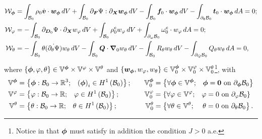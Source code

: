 %
\begin{equation}\label{eqn:weak forms for the dynamic formulation}
	\begin{aligned}
%
		\mathcal{W}_{\vect{\phi}} &  = \int_{\mathcal{B}_0}\rho_0\dot{\vect{v}}\cdot\vect{w}_{\vect{\phi}}\,dV + \int_{\mathcal{B}_0}\partial_{\vect{F}}\Psi:\partial_{\vect{X}}\vect{w}_{\vect{\phi}}\,dV\-  -\int_{\mathcal{B}_0}\vect{f}_0\cdot\vect{w}_{\vect{\phi}}\,dV-
		\int_{\partial_{\boldsymbol{t}}\mathcal{B}_0}\vect{t}_0\cdot\vect{w}_{\vect{\phi}}\,dA=0;\\
		\mathcal{W}_{{\varphi}} &  =  -\int_{\mathcal{B}_0}\partial_{\vect{D}_0}\Psi\cdot\partial_{\vect{X}}{w}_{{\varphi}}\,dV +\int_{\mathcal{B}_0}\rho_0^e {w}_{{\varphi}}\,dV+
\int_{\partial_{\omega}\mathcal{B}_0}{\omega}^e_0\cdot{w}_{{\varphi}}\,dA=0;\\		
		\mathcal{W}_{{\theta}}& =  -\int_{\mathcal{B}_0}\theta\dot{\left({\partial_{\theta}\Psi}\right)}w_{\theta}\,dV - \int_{\mathcal{B}_0}\vect{Q}\cdot\vect{\nabla}_0w_{\theta}\,dV - \int_{\mathcal{B}_0}R_{\theta}{w}_{\theta}\,dV - \int_{\partial_{Q}\mathcal{B}_{0}}Q_{\theta}w_{\theta}\,dA=0,
	\end{aligned}
\end{equation}
%
{where
	$\{\boldsymbol{\phi},\varphi,\theta\}\in \mathbb{V}^{\boldsymbol{\phi}}\times\mathbb{V}^{{\varphi}}\times\mathbb{V}^{\theta}$ and  $\{\boldsymbol{w}_{\boldsymbol{\phi}},{w}_{{\varphi}},{w}_{\theta}\}\in \mathbb{V}_0^{\boldsymbol{\phi}}\times\mathbb{V}_0^{{\varphi}}\times\mathbb{V}_0^{\theta}$\footnote{Notice in that $\boldsymbol{\phi}$ must satisfy in addition the condition $J>0$ a.e.}, with}
%
{\begin{equation}\label{eqn:functional spaces}
		\begin{aligned}
			\mathbb{V}^{\vect{\phi}} & = \left\{\vect{\phi}:\mathcal{B}_0\rightarrow \mathbb{R}^3;\,\,\,\,\, \left(\vect{\phi}\right)_{i}\in H^1\left(\mathcal{B}_0\right)\right\};&\quad
%			
			\mathbb{V}_0^{{\vect{\phi}}} & = \left\{\forall\vect{\phi}\in\mathbb{V}^{\vect{\phi}};\,\,\,\,\, \vect{\phi} = \vect{0} \,\,\text{on}\,\,\partial_{\vect{\phi}}\mathcal{B}_0\right\}\\
%						
			\mathbb{V}^{{\varphi}} & = \left\{{\varphi}:\mathcal{B}_0\rightarrow \mathbb{R};\,\,\,\,\, {\varphi}\in H^1\left(\mathcal{B}_0\right)\right\};&\quad			
			\mathbb{V}_0^{{{\varphi}}} & = \left\{\forall{\varphi}\in\mathbb{V}^{\varphi};\,\,\,\,\, {\varphi} = {0} \,\,\text{on}\,\,\partial_{{\varphi}}\mathcal{B}_0\right\}\\
%			
			\mathbb{V}^{{\theta}} & = \left\{\theta:\mathcal{B}_0\rightarrow\mathbb{R};\,\,\,\,\, {\theta}\in H^1\left(\mathcal{B}_0\right)\right\};&\quad
			\mathbb{V}_0^{{\theta}} & = \left\{\forall\theta\in\mathbb{V}^{\theta};\,\,\,\,\,\,\,{\theta} = {0} \,\,\text{on}\,\,\partial_{{\theta}}\mathcal{B}_0\right\}.
		\end{aligned}
\end{equation}}



